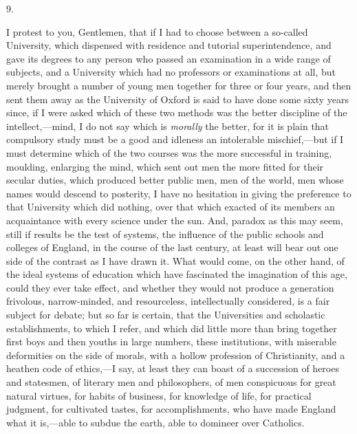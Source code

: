 9.

I protest to you, Gentlemen, that if I had to choose between a
so-called University, which dispensed with residence and tutorial
superintendence, and gave its degrees to any person who passed an
examination in a wide range of subjects, and a University which had no
professors or examinations at all, but merely brought a number of
young men together for three or four years, and then sent them away as
the University of Oxford is said to have done some sixty years since,
if I were asked which of these two methods was the better discipline
of the intellect,—mind, I do not say which is \emph{morally} the
better, for it is plain that compulsory study must be a good and
idleness an intolerable mischief,—but if I must determine which of
the two courses was the more successful in training, moulding,
enlarging the mind, which sent out men the more fitted for their
secular duties, which produced better public men, men of the world,
men whose names would descend to posterity, I have no hesitation in
giving the preference to that University which did nothing, over that
which exacted of its members an acquaintance with every science under
the sun. And, paradox as this may seem, still if results be the test
of systems, the influence of the public schools and colleges of
England, in the course of the last century, at least will bear out one
side of the contrast as I have drawn it. What would come, on the other
hand, of the ideal systems of education which have fascinated the
imagination of this age, could they ever take effect, and whether they
would not produce a generation frivolous, narrow-minded, and
resourceless, intellectually considered, is a fair subject for
debate; but so far is certain, that the Universities and scholastic
establishments, to which I refer, and which did little more than bring
together first boys and then youths in large numbers, these
institutions, with miserable deformities on the side of morals, with a
hollow profession of Christianity, and a heathen code of ethics,—I
say, at least they can boast of a succession of heroes and statesmen,
of literary men and philosophers, of men conspicuous for great natural
virtues, for habits of business, for knowledge of life, for practical
judgment, for cultivated tastes, for accomplishments, who have made
England what it is,—able to subdue the earth, able to domineer over
Catholics.

